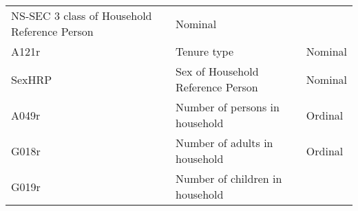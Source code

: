\documentclass[]{article}
\begin{document}
\begin{longtable}[]{@{}lll@{}}
\begin{minipage}[t]{0.64\columnwidth}
NS-SEC 3 class of Household Reference Person\strut
\end{minipage} & \begin{minipage}[t]{0.14\columnwidth}\raggedright
Nominal\strut
\end{minipage}\tabularnewline
\begin{minipage}[t]{0.14\columnwidth}\raggedright
A121r\strut
\end{minipage} & \begin{minipage}[t]{0.64\columnwidth}\raggedright
Tenure type\strut
\end{minipage} & \begin{minipage}[t]{0.14\columnwidth}\raggedright
Nominal\strut
\end{minipage}\tabularnewline
\begin{minipage}[t]{0.14\columnwidth}\raggedright
SexHRP\strut
\end{minipage} & \begin{minipage}[t]{0.64\columnwidth}\raggedright
Sex of Household Reference Person\strut
\end{minipage} & \begin{minipage}[t]{0.14\columnwidth}\raggedright
Nominal\strut
\end{minipage}\tabularnewline
\begin{minipage}[t]{0.14\columnwidth}\raggedright
A049r\strut
\end{minipage} & \begin{minipage}[t]{0.64\columnwidth}\raggedright
Number of persons in household\strut
\end{minipage} & \begin{minipage}[t]{0.14\columnwidth}\raggedright
Ordinal\strut
\end{minipage}\tabularnewline
\begin{minipage}[t]{0.14\columnwidth}\raggedright
G018r\strut
\end{minipage} & \begin{minipage}[t]{0.64\columnwidth}\raggedright
Number of adults in household\strut
\end{minipage} & \begin{minipage}[t]{0.14\columnwidth}\raggedright
Ordinal\strut
\end{minipage}\tabularnewline
\begin{minipage}[t]{0.14\columnwidth}\raggedright
G019r\strut
\end{minipage} & \begin{minipage}[t]{0.64\columnwidth}\raggedright
Number of children in household\strut

\end{minipage}
\end{longtable}
\end{document}

